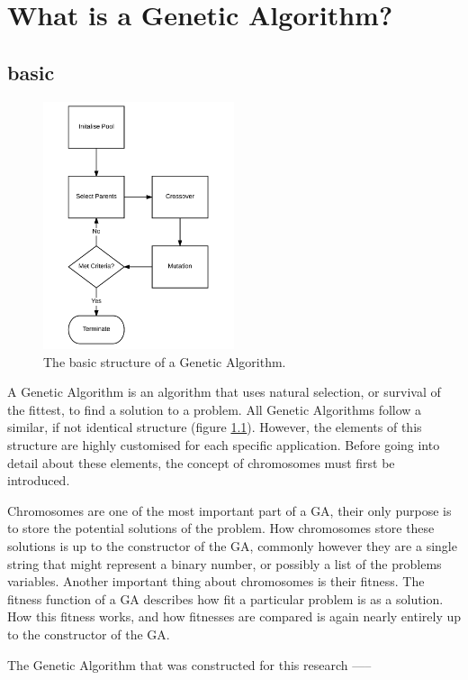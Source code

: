 \chapter{What is a Genetic Algorithm?}
\section{basic}
\par
\begin{figure}[h]
	\centering
		\includegraphics[width=0.5\textwidth]{GA_Structure}
	\caption{The basic structure of a Genetic Algorithm.}
	\label{struct}
\end{figure}
A Genetic Algorithm is an algorithm that uses natural selection, or survival of the fittest, to find a solution to a problem. All Genetic Algorithms follow a similar, if not identical structure (figure \ref{struct}). However, the elements of this structure are highly customised for each specific application. Before going into detail about these elements, the concept of chromosomes must first be introduced.
\par
Chromosomes are one of the most important part of a GA, their only purpose is to store the potential solutions of the problem. How chromosomes store these solutions is up to the constructor of the GA, commonly however they are a single string that might represent a binary number, or possibly a list of the problems variables. Another important thing about chromosomes is their fitness. The fitness function of a GA describes how fit a particular problem is as a solution. How this fitness works, and how fitnesses are compared is again nearly entirely up to the constructor of the GA.
\par
The Genetic Algorithm that was constructed for this research -----

